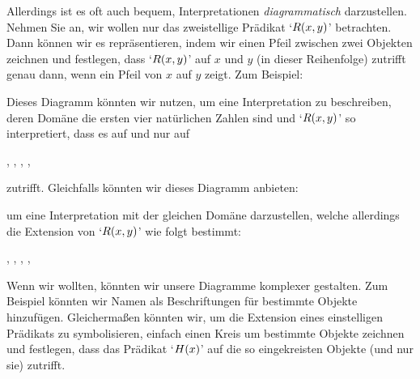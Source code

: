Allerdings ist es oft auch bequem, Interpretationen \emph{diagrammatisch} darzustellen. Nehmen Sie an, wir wollen nur das zweistellige Prädikat `$\mathord{R}(x,y)$' betrachten. Dann können wir es repräsentieren, indem wir einen Pfeil zwischen zwei Objekten zeichnen und festlegen, dass `$\mathord{R}(x,y)$' auf $x$ und $y$ (in dieser Reihenfolge) zutrifft genau dann, wenn ein Pfeil von $x$ auf $y$ zeigt. Zum Beispiel:
\begin{center}
\end{center}
Dieses Diagramm könnten wir nutzen, um eine Interpretation zu beschreiben, deren Domäne die ersten vier natürlichen Zahlen sind und `$\mathord{R}(x,y)$' so interpretiert, dass es auf und nur auf
	\begin{center}
		, 
		, 
		, 
		, 
	\end{center}
zutrifft. Gleichfalls könnten wir dieses Diagramm anbieten:
\begin{center}
\end{center}
um eine Interpretation mit der gleichen Domäne darzustellen, welche allerdings die Extension von `$\mathord{R}(x,y)$' wie folgt bestimmt:
	\begin{center}
		, 
		, 
		, 
		,
	\end{center}
Wenn wir wollten, könnten wir unsere Diagramme komplexer gestalten. Zum Beispiel könnten wir Namen als Beschriftungen für bestimmte Objekte hinzufügen. Gleicherma{\ss}en könnten wir, um die Extension eines einstelligen Prädikats zu symbolisieren, einfach einen Kreis um bestimmte Objekte zeichnen und festlegen, dass das Prädikat `$\mathord{H}(x)$' auf die so eingekreisten Objekte (und nur sie) zutrifft. 

